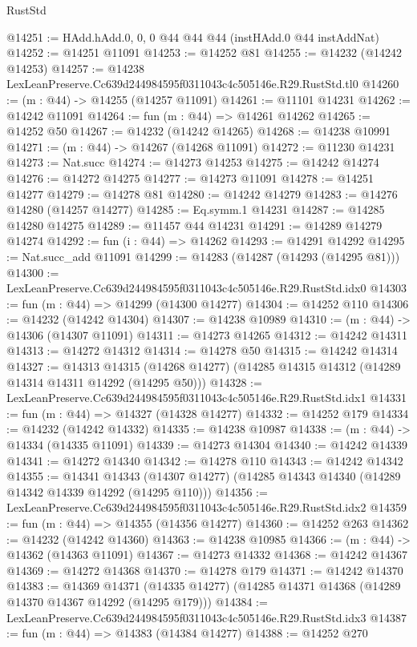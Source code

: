 \begin{lexlean}{RustStd}
\begin{coremodule}
@14251 := HAdd.hAdd.{0, 0, 0} @44 @44 @44 (instHAdd.{0} @44 instAddNat)
@14252 := @14251 @11091
@14253 := @14252 @81
@14255 := @14232 (@14242 @14253)
@14257 := @14238 LexLeanPreserve.Cc639d244984595f0311043c4c505146e.R29.RustStd.tl0
@14260 := (m : @44) -> @14255 (@14257 @11091)
@14261 := @11101 @14231
@14262 := @14242 @11091
@14264 := fun (m : @44) => @14261 @14262
@14265 := @14252 @50
@14267 := @14232 (@14242 @14265)
@14268 := @14238 @10991
@14271 := (m : @44) -> @14267 (@14268 @11091)
@14272 := @11230 @14231
@14273 := Nat.succ
@14274 := @14273 @14253
@14275 := @14242 @14274
@14276 := @14272 @14275
@14277 := @14273 @11091
@14278 := @14251 @14277
@14279 := @14278 @81
@14280 := @14242 @14279
@14283 := @14276 @14280 (@14257 @14277)
@14285 := Eq.symm.{1} @14231
@14287 := @14285 @14280 @14275
@14289 := @11457 @44 @14231
@14291 := @14289 @14279 @14274
@14292 := fun (i : @44) => @14262
@14293 := @14291 @14292
@14295 := Nat.succ_add @11091
@14299 := @14283 (@14287 (@14293 (@14295 @81)))
@14300 := LexLeanPreserve.Cc639d244984595f0311043c4c505146e.R29.RustStd.idx0
@14303 := fun (m : @44) => @14299 (@14300 @14277)
@14304 := @14252 @110
@14306 := @14232 (@14242 @14304)
@14307 := @14238 @10989
@14310 := (m : @44) -> @14306 (@14307 @11091)
@14311 := @14273 @14265
@14312 := @14242 @14311
@14313 := @14272 @14312
@14314 := @14278 @50
@14315 := @14242 @14314
@14327 := @14313
    @14315
    (@14268 @14277)
    (@14285 @14315 @14312 (@14289 @14314 @14311 @14292 (@14295 @50)))
@14328 := LexLeanPreserve.Cc639d244984595f0311043c4c505146e.R29.RustStd.idx1
@14331 := fun (m : @44) => @14327 (@14328 @14277)
@14332 := @14252 @179
@14334 := @14232 (@14242 @14332)
@14335 := @14238 @10987
@14338 := (m : @44) -> @14334 (@14335 @11091)
@14339 := @14273 @14304
@14340 := @14242 @14339
@14341 := @14272 @14340
@14342 := @14278 @110
@14343 := @14242 @14342
@14355 := @14341
    @14343
    (@14307 @14277)
    (@14285 @14343 @14340 (@14289 @14342 @14339 @14292 (@14295 @110)))
@14356 := LexLeanPreserve.Cc639d244984595f0311043c4c505146e.R29.RustStd.idx2
@14359 := fun (m : @44) => @14355 (@14356 @14277)
@14360 := @14252 @263
@14362 := @14232 (@14242 @14360)
@14363 := @14238 @10985
@14366 := (m : @44) -> @14362 (@14363 @11091)
@14367 := @14273 @14332
@14368 := @14242 @14367
@14369 := @14272 @14368
@14370 := @14278 @179
@14371 := @14242 @14370
@14383 := @14369
    @14371
    (@14335 @14277)
    (@14285 @14371 @14368 (@14289 @14370 @14367 @14292 (@14295 @179)))
@14384 := LexLeanPreserve.Cc639d244984595f0311043c4c505146e.R29.RustStd.idx3
@14387 := fun (m : @44) => @14383 (@14384 @14277)
@14388 := @14252 @270

\end{coremodule}
\end{lexlean}

